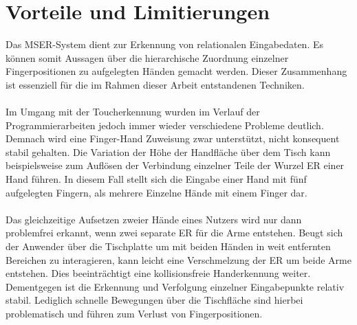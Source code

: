 \section{Vorteile und Limitierungen}
\label{sec:diskussion_mser}

Das MSER-System dient zur Erkennung von relationalen Eingabedaten. Es können somit Aussagen über die hierarchische Zuordnung einzelner Fingerpositionen zu aufgelegten Händen gemacht werden. Dieser Zusammenhang ist essenziell für die im Rahmen dieser Arbeit entstandenen Techniken. 
\\\\ 
Im Umgang mit der Toucherkennung wurden im Verlauf der Programmierarbeiten jedoch immer wieder verschiedene Probleme deutlich. Demnach wird eine Finger-Hand Zuweisung zwar unterstützt, nicht konsequent stabil gehalten. Die Variation der Höhe der Handfläche über dem Tisch kann beispielsweise zum Auflösen der Verbindung einzelner Teile der Wurzel ER einer Hand führen. In diesem Fall stellt sich die Eingabe einer Hand mit fünf aufgelegten Fingern, als mehrere Einzelne Hände mit einem Finger dar. 
\\\\
Das gleichzeitige Aufsetzen zweier Hände eines Nutzers wird nur dann problemfrei erkannt, wenn zwei separate ER für die Arme entstehen. Beugt sich der Anwender über die Tischplatte um mit beiden Händen in weit entfernten Bereichen zu interagieren, kann leicht eine Verschmelzung der ER um beide Arme entstehen. Dies beeinträchtigt eine kollisionsfreie Handerkennung weiter. Dementgegen ist die Erkennung und Verfolgung einzelner Eingabepunkte relativ stabil. Lediglich schnelle Bewegungen über die Tischfläche sind hierbei problematisch und führen zum Verlust von Fingerpositionen.
